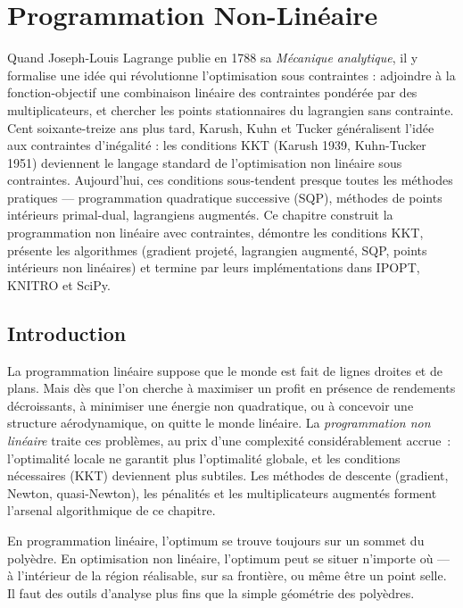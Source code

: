 \chapter{Programmation Non-Lin\'eaire}
\label{ch:non_lineaire}

Quand Joseph-Louis Lagrange publie en 1788 sa \emph{Mécanique analytique}, il y formalise une idée qui révolutionne l'optimisation sous contraintes : adjoindre à la fonction-objectif une combinaison linéaire des contraintes pondérée par des multiplicateurs, et chercher les points stationnaires du lagrangien sans contrainte. Cent soixante-treize ans plus tard, Karush, Kuhn et Tucker généralisent l'idée aux contraintes d'inégalité : les conditions KKT (Karush 1939, Kuhn-Tucker 1951) deviennent le langage standard de l'optimisation non linéaire sous contraintes. Aujourd'hui, ces conditions sous-tendent presque toutes les méthodes pratiques --- programmation quadratique successive (SQP), méthodes de points intérieurs primal-dual, lagrangiens augmentés. Ce chapitre construit la programmation non linéaire avec contraintes, démontre les conditions KKT, présente les algorithmes (gradient projeté, lagrangien augmenté, SQP, points intérieurs non linéaires) et termine par leurs implémentations dans IPOPT, KNITRO et SciPy.

\section{Introduction}

La programmation lin\'eaire suppose que le monde est fait de lignes droites et de plans. Mais d\`es que l'on cherche \`a maximiser un profit en pr\'esence de rendements d\'ecroissants, \`a minimiser une \'energie non quadratique, ou \`a concevoir une structure a\'erodynamique, on quitte le monde lin\'eaire. La \emph{programmation non lin\'eaire} traite ces probl\`emes, au prix d'une complexit\'e consid\'erablement accrue~: l'optimalit\'e locale ne garantit plus l'optimalit\'e globale, et les conditions n\'ecessaires (KKT) deviennent plus subtiles. Les m\'ethodes de descente (gradient, Newton, quasi-Newton), les p\'enalit\'es et les multiplicateurs augment\'es forment l'arsenal algorithmique de ce chapitre.

\begin{intuition}
En programmation lin\'eaire, l'optimum se trouve toujours sur un sommet du
poly\`edre. En optimisation non lin\'eaire, l'optimum peut se situer n'importe
o\`u --- \`a l'int\'erieur de la r\'egion r\'ealisable, sur sa fronti\`ere, ou
m\^eme \^etre un point selle. Il faut des outils d'analyse plus fins que la
simple g\'eom\'etrie des poly\`edres.
\end{intuition}

